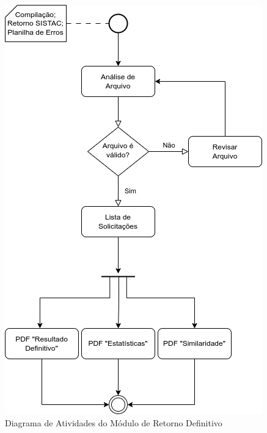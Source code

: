 \documentclass[
	12pt,			%
	openright,		%
	oneside,	
	a4paper,		%
	english,		%
	brazil			%
]{abntex2/abntex2}  %
\begin{document}
		\clearpage
		\begin{figure}[ht]
			\begin{center}
				
				\caption{Diagrama de Atividades do Módulo de Retorno Definitivo}
				\includegraphics[scale=0.85]{img/diagrama-ativs-definitivo}
				
			\end{center}
		\end{figure}
		
\end{document}

